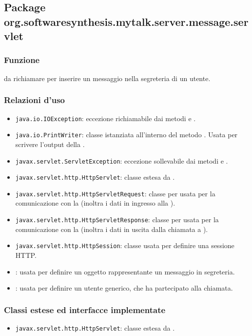 \subsection{Package org.softwaresynthesis.mytalk.server.message.servlet}\label{sec:messageServlet}


\subsubsection*{Funzione}
 da richiamare per inserire un messaggio nella segreteria di un utente.

\subsubsection*{Relazioni d'uso}
\begin{itemize}
	\item \texttt{java.io.IOException}: eccezione richiamabile dai metodi  e .
	\item \texttt{java.io.PrintWriter}: classe istanziata all'interno del metodo . Usata per scrivere l'output della .
	\item \texttt{javax.servlet.ServletException}: eccezione sollevabile dai metodi  e .
	\item \texttt{javax.servlet.http.HttpServlet}: classe estesa da .
	\item \texttt{javax.servlet.http.HttpServletRequest}:  classe per usata per la comunicazione con la  (inoltra i dati in ingresso alla ).
	\item \texttt{javax.servlet.http.HttpServletResponse}: classe per usata per la comunicazione con la  (inoltra i dati in uscita dalla chiamata a ).
	\item \texttt{javax.servlet.http.HttpSession}: classe usata per definire una sessione HTTP.
	\item {}: usata per definire un oggetto rappresentante un messaggio in segreteria.
	\item {}: usata per definire un utente generico, che ha partecipato alla chiamata.
\end{itemize}

\subsubsection*{Classi estese ed interfacce implementate}
\begin{itemize}
	\item \texttt{javax.servlet.http.HttpServlet}: classe estesa da .
\end{itemize}

